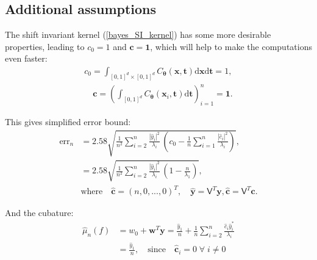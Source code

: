 \documentclass[twocolumn]{svjour3}          %
\newcommand{\bm}[1]{\boldsymbol{#1}}
\newcommand{\dif}[1]{\text{d}{#1}}
\newcommand{\vtheta}{{\bm{\theta}}}
\newcommand{\vc}{\bm{c}}
\newcommand{\vt}{\bm{t}}
\newcommand{\vw}{\bm{w}}
\newcommand{\vx}{\bm{x}}
\newcommand{\dvx}{\dif{\bm{x}}}
\newcommand{\dvt}{\dif{\bm{t}}}
\newcommand{\vy}{\bm{y}}
\newcommand{\vone}{\bm{1}}
\newcommand{\mV}{\mathsf{V}}
\newcommand{\hmu}{\widehat{\mu}}
\newcommand{\errn}{\text{err}_{n}}
\def\abs#1{\ensuremath{\left \lvert #1 \right \rvert}}
\begin{document}
\subsection{Additional assumptions}
The shift invariant kernel (\ref{bayes_SI_kernel}) has some more desirable properties, leading to $c_0=1$ and $\vc = \vone$, which will help to make the computations even faster:
\begin{multline*}
\displaystyle
c_0 =\int_{[0,1]^d\times [0,1]^d}C_\vtheta(\vx,\vt) \dvx \dvt = 1, 
\\
\quad \vc = \left( \int_{[0,1]^d}C_\vtheta(\vx_i,\vt) \dvt\right)_{i=1}^n = \vone .
\end{multline*}

This gives simplified error bound:
\begin{align*}
\errn &=
2.58\sqrt{
\frac {1}{n^2} \sum_{i=2}^{n} \frac{\abs{\widehat{y}_i}^2}{\lambda_i}  
\,
\left( c_0 - \frac 1n \sum_{i=1}^n \frac{\abs{\widehat{c}_i}^2}{\lambda_i} \right) 
}, 
\\
&= 
2.58\sqrt{
\frac {1}{n^2} \sum_{i=2}^{n} \frac{\abs{\widehat{y}_i}^2}{\lambda_i}  
\,
\left( 1 - \frac{n}{\lambda_1}  \right) 
}, 
\\
& \text{where} \quad \widehat{\vc} = (n,0,...,0)^T, \quad 
\widehat{\vy} = \mV^T \vy,  
\widehat{\vc} = \mV^T \vc. 
\end{align*}


And the cubature:
\begin{align*}
\nonumber
\hmu_n(f) &= w_0 + \vw^T \vy 
= 
\frac{\widehat{y}_1}{n} +
\frac 1n \sum_{i=2}^n \frac{ \widehat{c}_i \widehat{y}_i^*}{\lambda_i} \\
& = \frac{\widehat{y}_1}{n}, \quad \text{since} \quad
 \widehat{\vc}_i=0 \; \forall \; i \neq 0
\end{align*}
\end{document}
